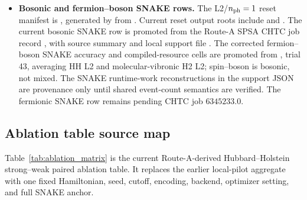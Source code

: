 \documentclass[
  reprint,
  amsmath,
  amssymb,
  aps,
  pra,
  nofootinbib,
  superscriptaddress,
  floatfix
]{revtex4-2}
\begin{document}
\begin{itemize}
\item \textbf{Bosonic and fermion--boson SNAKE rows.} The L2/$n_{\rm ph}=1$ reset manifest is , generated by  from . Current reset output roots include  and . The current bosonic SNAKE row is promoted from the Route-A SPSA CHTC job record , with source summary  and local support file . The corrected fermion--boson SNAKE accuracy and compiled-resource cells are promoted from , trial 43, averaging HH L2 and molecular-vibronic H2 L2; spin--boson is bosonic, not mixed. The SNAKE runtime-work reconstructions in the support JSON are provenance only until shared event-count semantics are verified. The fermionic SNAKE row remains pending CHTC job $6345233.0$.
\end{itemize}

\subsection{Ablation table source map}
\label{app:table_ii_source_map}

Table~\ref{tab:ablation_matrix} is the current Route-A-derived Hubbard--Holstein strong--weak paired ablation table. It replaces the earlier local-pilot aggregate with one fixed Hamiltonian, seed, cutoff, encoding, backend, optimizer setting, and full SNAKE anchor.
\end{document}
